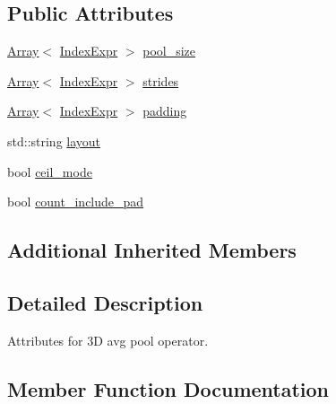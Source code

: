 \subsection*{Public Attributes}
\begin{DoxyCompactItemize}
\item 
\hyperlink{classtvm_1_1Array}{Array}$<$ \hyperlink{namespacetvm_1_1relay_ae153a27d81399fd266b8d598227764c4}{Index\+Expr} $>$ \hyperlink{structtvm_1_1relay_1_1AvgPool3DAttrs_a1bb7f4c5299fcea1a2ed28ce770018a3}{pool\+\_\+size}
\item 
\hyperlink{classtvm_1_1Array}{Array}$<$ \hyperlink{namespacetvm_1_1relay_ae153a27d81399fd266b8d598227764c4}{Index\+Expr} $>$ \hyperlink{structtvm_1_1relay_1_1AvgPool3DAttrs_a10d2de4e2d1d5979d8d6b9c6f7ef9757}{strides}
\item 
\hyperlink{classtvm_1_1Array}{Array}$<$ \hyperlink{namespacetvm_1_1relay_ae153a27d81399fd266b8d598227764c4}{Index\+Expr} $>$ \hyperlink{structtvm_1_1relay_1_1AvgPool3DAttrs_a629605080942e97dc4038d2734a567e6}{padding}
\item 
std\+::string \hyperlink{structtvm_1_1relay_1_1AvgPool3DAttrs_ad1e17819d80be259bbe9e1ba7a555f45}{layout}
\item 
bool \hyperlink{structtvm_1_1relay_1_1AvgPool3DAttrs_a74189cc04dbb6c2d82e2c2d68d94ecb5}{ceil\+\_\+mode}
\item 
bool \hyperlink{structtvm_1_1relay_1_1AvgPool3DAttrs_ae59fca8d9b4572dc87c46520262c595b}{count\+\_\+include\+\_\+pad}
\end{DoxyCompactItemize}
\subsection*{Additional Inherited Members}


\subsection{Detailed Description}
Attributes for 3D avg pool operator. 

\subsection{Member Function Documentation}

